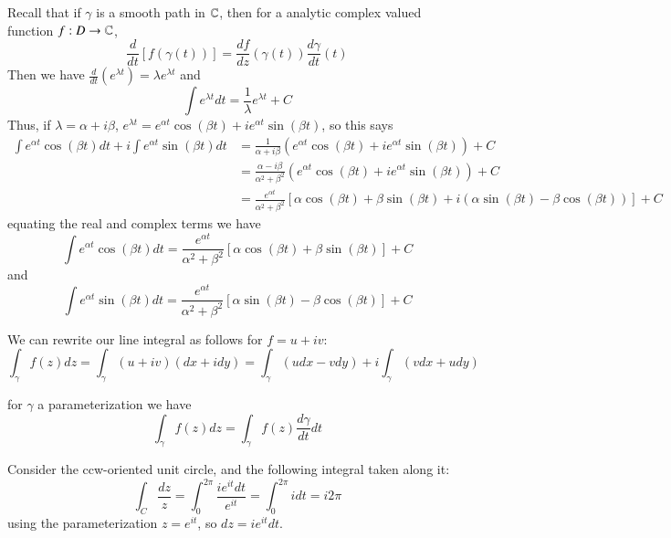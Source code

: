 Recall that if $\gamma$ is a smooth path in $\mathbb C$, then for a analytic complex valued function $f:D\rightarrow \mathbb C$, \begin{equation*}
    \frac{d}{dt}\left[f(\gamma(t))\right] = \frac{df}{dz}(\gamma(t))\frac{d\gamma}{dt}(t)
\end{equation*}
Then we have $\frac{d}{dt}(e^{\lambda t}) = \lambda e^{\lambda t}$ and \begin{equation*}
    \int e^{\lambda t}dt = \frac{1}{\lambda}e^{\lambda t}+C
\end{equation*}
Thus, if $\lambda = \alpha+i\beta$, $e^{\lambda t} = e^{\alpha t}\cos(\beta t)+ie^{\alpha t}\sin(\beta t)$, so this says \begin{align*}
    \int e^{\alpha t}\cos(\beta t)dt + i\int e^{\alpha t}\sin(\beta t)dt &= \frac{1}{\alpha+i\beta}(e^{\alpha t}\cos(\beta t)+ie^{\alpha t}\sin(\beta t)) + C \\
    &= \frac{\alpha-i\beta}{\alpha^2+\beta^2}(e^{\alpha t}\cos(\beta t)+ie^{\alpha t}\sin(\beta t)) + C \\
    &= \frac{e^{\alpha t}}{\alpha^2+\beta^2}[\alpha\cos(\beta t) + \beta\sin(\beta t) + i(\alpha\sin(\beta t) - \beta\cos(\beta t))] + C
\end{align*}
equating the real and complex terms we have \begin{equation*}
    \int e^{\alpha t}\cos(\beta t)dt = \frac{e^{\alpha t}}{\alpha^2+\beta^2}[\alpha\cos(\beta t) + \beta\sin(\beta t)] + C
\end{equation*}
and \begin{equation*}
    \int e^{\alpha t}\sin(\beta t)dt = \frac{e^{\alpha t}}{\alpha^2+\beta^2}[\alpha\sin(\beta t) - \beta\cos(\beta t)] + C
\end{equation*}

\begin{definition}
    We can rewrite our line integral as follows for $f = u+iv$: \begin{equation*}
        \int_{\gamma}f(z)dz = \int_{\gamma}(u+iv)(dx+idy) = \int_{\gamma}(udx-vdy)+i\int_{\gamma}(vdx+udy)
    \end{equation*}
\end{definition}

for $\gamma$ a parameterization we have \begin{equation*}
    \int_{\gamma}f(z)dz = \int_{\gamma}f(z)\frac{d\gamma}{dt}dt
\end{equation*}

\begin{example}
    Consider the ccw-oriented unit circle, and the following integral taken along it: \begin{equation*}
        \int_{C}\frac{dz}{z} = \int_{0}^{2\pi}\frac{ie^{it}dt}{e^{it}} = \int_{0}^{2\pi}idt = i2\pi
    \end{equation*}
    using the parameterization $z = e^{it}$, so $dz = ie^{it}dt$.
\end{example}

